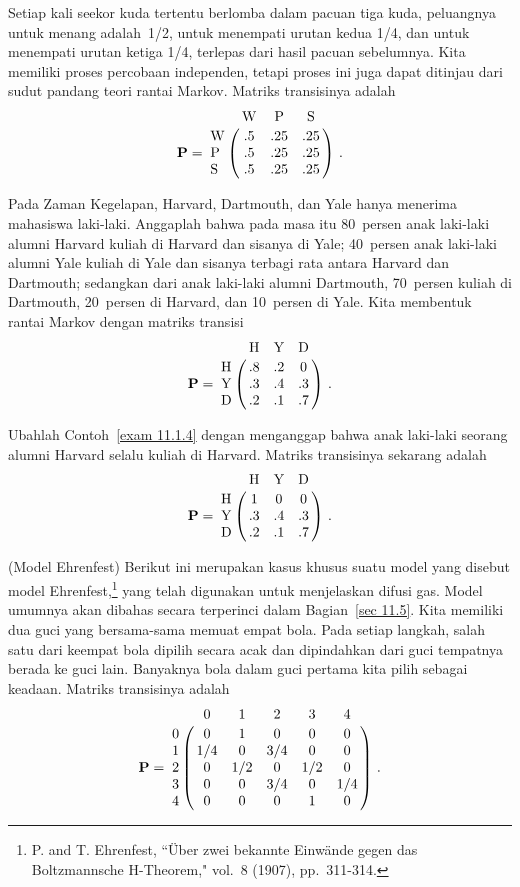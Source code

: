 \begin{example}\label{exam 11.1.3}
Setiap kali seekor kuda tertentu berlomba dalam pacuan tiga kuda, peluangnya
untuk menang adalah~1/2, untuk menempati urutan kedua 1/4, dan untuk menempati
urutan ketiga 1/4, terlepas dari hasil pacuan sebelumnya. Kita memiliki proses
percobaan independen, tetapi proses ini juga dapat ditinjau dari sudut pandang
teori rantai Markov. Matriks transisinya adalah
$$
\mat{P} = \bordermatrix{
        & \mbox{W} & \mbox{P} & \mbox{S} \cr
\mbox{W} &      .5 &      .25 &      .25 \cr
\mbox{P} &      .5 &      .25 &      .25 \cr
\mbox{S} &      .5 &      .25 &      .25}\ .
$$
\end{example}
\vskip -3pt
\begin{example}\label{exam 11.1.4}
Pada Zaman Kegelapan, Harvard, Dartmouth, dan Yale hanya menerima mahasiswa
laki-laki. Anggaplah bahwa pada masa itu 80~persen anak laki-laki alumni
Harvard kuliah di Harvard dan sisanya di Yale; 40~persen anak laki-laki alumni
Yale kuliah di Yale dan sisanya terbagi rata antara Harvard dan Dartmouth;
sedangkan dari anak laki-laki alumni Dartmouth, 70~persen kuliah di Dartmouth,
20~persen di Harvard, dan 10~persen di Yale. Kita membentuk rantai Markov dengan
matriks transisi
$$
\mat{P} = \bordermatrix{
        & \mbox{H} & \mbox{Y} & \mbox{D} \cr
\mbox{H} &      .8 &      .2 &       0 \cr
\mbox{Y} &      .3 &      .4 &      .3 \cr 
\mbox{D} &      .2 &      .1 &      .7}\ .
$$
\end{example}
\vskip -3pt
\begin{example}\label{exam 11.1.5}
Ubahlah Contoh~\ref{exam 11.1.4} dengan menganggap bahwa anak laki-laki seorang
alumni Harvard selalu kuliah di Harvard. Matriks transisinya sekarang adalah
$$
\mat{P} = \bordermatrix{
        & \mbox{H} & \mbox{Y} & \mbox{D} \cr
\mbox{H} &       1 &       0 &       0 \cr
\mbox{Y} &      .3 &      .4 &      .3 \cr
\mbox{D} &      .2 &      .1 &      .7}\ .
$$
\end{example}
\vskip -3pt
\begin{example}\label{exam 11.1.6}
(Model Ehrenfest) Berikut ini merupakan kasus khusus suatu model yang disebut
model Ehrenfest,\footnote{P. and T. Ehrenfest, ``\"{U}ber zwei bekannte Einw\"{a}nde
gegen das
Boltzmannsche  H-Theorem,"  vol.~8 (1907),
pp.~311-314.}
yang telah digunakan untuk menjelaskan difusi gas. Model umumnya akan dibahas
secara terperinci dalam Bagian~\ref{sec 11.5}. Kita memiliki dua guci yang
bersama-sama memuat empat bola. Pada setiap langkah, salah satu dari keempat
bola dipilih secara acak dan dipindahkan dari guci tempatnya berada ke guci
lain. Banyaknya bola dalam guci pertama kita pilih sebagai keadaan. Matriks
transisinya adalah
$$
 \mat {P} = \bordermatrix{
  &  0  &  1  &  2  &  3  &  4  \cr
0 &  0  &  1  &  0  &  0  &  0  \cr
1 & 1/4 &  0  & 3/4 &  0  &  0  \cr
2 &  0  & 1/2 &  0  & 1/2 &  0  \cr
3 &  0  &  0  & 3/4 &  0  & 1/4 \cr
4 &  0  &  0  &  0  &  1  &  0 \cr}\ . 
$$
\end{example}

